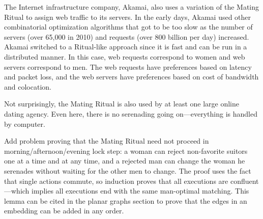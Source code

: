 The Internet infrastructure company, Akamai, also uses a variation of
the Mating Ritual to assign web traffic to its servers.  In the early
days, Akamai used other combinatorial optimization algorithms that got
to be too slow as the number of servers (over 65,000 in 2010) and
requests (over 800 billion per day) increased.  Akamai switched to a
Ritual-like approach since it is fast and can be run in a distributed
manner.  In this case, web requests correspond to women and web
servers correspond to men.  The web requests have preferences based on
latency and packet loss, and the web servers have preferences based on
cost of bandwidth and colocation.

Not surprisingly, the Mating Ritual is also used by at least one large
online dating agency.  Even here, there is no serenading going
on---everything is handled by computer.

\begin{problems}

\practiceproblems



\classproblems



\homeworkproblems




\begin{editingnotes}
\begin{problem*}
Add problem proving that the Mating Ritual need not proceed in
morning/afternoon/evening lock step: a woman can reject non-favorite
suitors one at a time and at any time, and a rejected man can change
the woman he serenades without waiting for the other men to change.
The proof uses the fact that single actions commute, so induction
proves that all executions are confluent---which implies all
executions end with the same man-optimal matching.  This lemma can be
cited in the planar graphs section to prove that the edges in an
embedding can be added in any order.
\end{problem*}
\end{editingnotes}

\end{problems}

